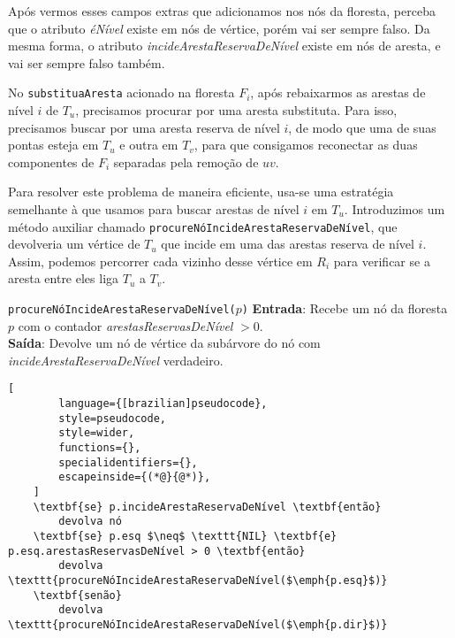 \raggedbottom

Após vermos esses campos extras que adicionamos nos nós da floresta, perceba que o atributo \textit{éNível} existe em nós de vértice, porém vai ser sempre falso. Da mesma forma, o atributo \textit{incideArestaReservaDeNível} existe em nós de aresta, e vai ser sempre falso também. 
 
No \texttt{substituaAresta} acionado na floresta $F_i$, após rebaixarmos as arestas de nível $i$ de $T_u$, precisamos procurar por uma aresta substituta. Para isso, precisamos buscar por uma aresta reserva de nível $i$, de modo que uma de suas pontas esteja em $T_u$ e outra em $T_v$, para que consigamos reconectar as duas componentes de $F_i$ separadas pela remoção de $uv$. 

Para resolver este problema de maneira eficiente, usa-se uma estratégia semelhante à que usamos para buscar arestas de nível $i$ em $T_u$. Introduzimos um método auxiliar chamado \texttt{procureNóIncideArestaReservaDeNível}, que devolveria um vértice de $T_u$ que incide em uma das arestas reserva de nível $i$. Assim, podemos percorrer cada vizinho desse vértice em $R_i$ para verificar se a aresta entre eles liga $T_u$ a $T_v$. 

\begin{programruledcaption}{\texttt{procureNóIncideArestaReservaDeNível($p$)} \label{prog:findReserveEdge-GD}}
    \noindent\textbf{Entrada}: Recebe um nó da floresta $p$ com o contador \textit{arestasReservasDeNível} $> 0$.
    \\
    \noindent\textbf{Saída}: Devolve um nó de vértice da subárvore do nó com \textit{incideArestaReservaDeNível} verdadeiro.
    \vspace{-0.5\baselineskip}
    \begin{lstlisting}[
        language={[brazilian]pseudocode},
        style=pseudocode,
        style=wider,
        functions={},
        specialidentifiers={},
        escapeinside={(*@}{@*)},
    ]
    \textbf{se} p.incideArestaReservaDeNível \textbf{então}
        devolva nó
    \textbf{se} p.esq $\neq$ \texttt{NIL} \textbf{e} p.esq.arestasReservasDeNível > 0 \textbf{então}
        devolva \texttt{procureNóIncideArestaReservaDeNível($\emph{p.esq}$)}
    \textbf{senão}
        devolva \texttt{procureNóIncideArestaReservaDeNível($\emph{p.dir}$)}
\end{lstlisting}
\vspace{-0.5\baselineskip}
\end{programruledcaption}

